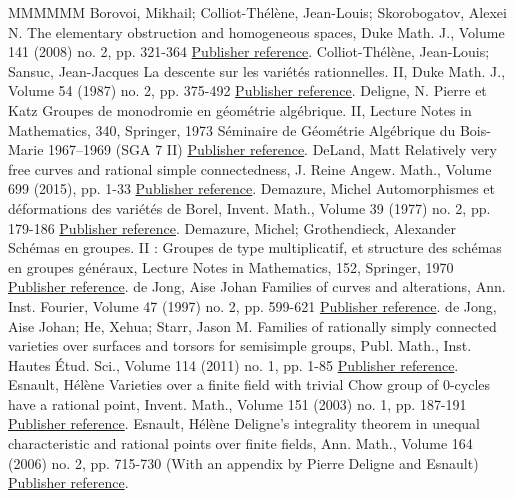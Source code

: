 \documentclass[11pt]{article}
\theoremstyle{definition}
\numberwithin{equation}{section}
\numberwithin{figure}{section}
\numberwithin{table}{section}
\begin{document}
\begin{thebibliography}{MMMMMM}
 Borovoi, Mikhail; Colliot-Thélène, Jean-Louis; Skorobogatov, Alexei N. The elementary obstruction and homogeneous spaces, Duke Math. J., Volume 141 (2008) no. 2, pp. 321-364 \href{https://ahl.centre-mersenne.org/item/AHL_2020__3__1399_0/#BCTSk}{Publisher reference}.
 Colliot-Thélène, Jean-Louis; Sansuc, Jean-Jacques La descente sur les variétés rationnelles. II, Duke Math. J., Volume 54 (1987) no. 2, pp. 375-492 \href{https://ahl.centre-mersenne.org/item/AHL_2020__3__1399_0/#CTSansuc}{Publisher reference}.
 Deligne, N. Pierre et Katz Groupes de monodromie en géométrie algébrique. II, Lecture Notes in Mathematics, 340, Springer, 1973 Séminaire de Géométrie Algébrique du Bois-Marie 1967–1969 (SGA 7 II) \href{https://ahl.centre-mersenne.org/item/AHL_2020__3__1399_0/#SGA7II}{Publisher reference}.
 DeLand, Matt Relatively very free curves and rational simple connectedness, J. Reine Angew. Math., Volume 699 (2015), pp. 1-33 \href{https://ahl.centre-mersenne.org/item/AHL_2020__3__1399_0/#DeLand}{Publisher reference}.
 Demazure, Michel Automorphismes et déformations des variétés de Borel, Invent. Math., Volume 39 (1977) no. 2, pp. 179-186 \href{https://ahl.centre-mersenne.org/item/AHL_2020__3__1399_0/#Demazure-Aut}{Publisher reference}.
 Demazure, Michel; Grothendieck, Alexander Schémas en groupes. II : Groupes de type multiplicatif, et structure des schémas en groupes généraux, Lecture Notes in Mathematics, 152, Springer, 1970 \href{https://ahl.centre-mersenne.org/item/AHL_2020__3__1399_0/#SGA3II}{Publisher reference}.
 de Jong, Aise Johan Families of curves and alterations, Ann. Inst. Fourier, Volume 47 (1997) no. 2, pp. 599-621 \href{https://ahl.centre-mersenne.org/item/AHL_2020__3__1399_0/#dJalter}{Publisher reference}.
 de Jong, Aise Johan; He, Xehua; Starr, Jason M. Families of rationally simply connected varieties over surfaces and torsors for semisimple groups, Publ. Math., Inst. Hautes Étud. Sci., Volume 114 (2011) no. 1, pp. 1-85 \href{https://ahl.centre-mersenne.org/item/AHL_2020__3__1399_0/#dJHS}{Publisher reference}.
 Esnault, Hélène Varieties over a finite field with trivial Chow group of 0-cycles have a rational point, Invent. Math., Volume 151 (2003) no. 1, pp. 187-191 \href{https://ahl.centre-mersenne.org/item/AHL_2020__3__1399_0/#Esnault}{Publisher reference}.
 Esnault, Hélène Deligne’s integrality theorem in unequal characteristic and rational points over finite fields, Ann. Math., Volume 164 (2006) no. 2, pp. 715-730 (With an appendix by Pierre Deligne and Esnault) \href{https://ahl.centre-mersenne.org/item/AHL_2020__3__1399_0/#Esnault_integrality}{Publisher reference}.

\end{thebibliography}
\end{document}

